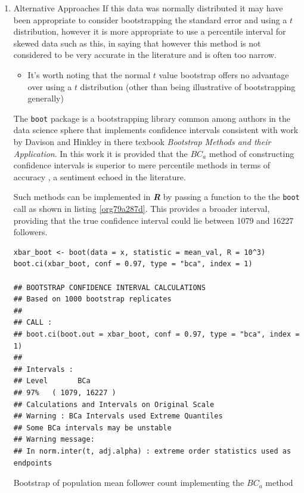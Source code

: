 \documentclass[11pt]{article}
\begin{document}
\begin{enumerate}
\item Alternative Approaches
\label{sec:org8f592e7}
If this data was normally distributed it may have been appropriate to consider
bootstrapping the standard error and using a \(t\) distribution, however it is more appropriate to use a
percentile interval for skewed data such as this, in saying that however this method is not considered to be very accurate in the literature and is often too narrow. \cite[Section 4.1]{hesterberg2015}

\begin{itemize}
\item It's worth noting that the normal \(t\) value bootstrap offers no advantage over
using a \(t\) distribution (other than being illustrative of bootstrapping
generally) \cite[Section 4.1]{hesterberg2015}
\end{itemize}


 The \texttt{boot} package is a bootstrapping library common among authors in the data science sphere
 \cite[p. 295]{james2013} \cite[p. 237]{wiley2019} that implements
 confidence intervals consistent with work by Davison and Hinkley
 \cite{ripley2020} in there texbook \emph{Bootstrap Methods and their Application}.
In this work it is provided that the \(BC_{a}\) method of constructing confidence
 intervals is  superior to mere percentile
 methods in terms of accuracy \cite[Ch. 5]{davison1997}, a sentiment echoed in the literature. \cite[Ch. 5]{carpenter2000,davison1997}

Such methods can be implemented in \textbf{\emph{R}} by passing a function to the the \texttt{boot} call as shown in listing \ref{org79a287d}. This provides a broader interval, providing that the true confidence interval could lie between 1079 and 16227 followers.

\begin{listing}[htbp]
\begin{verbatim}
xbar_boot <- boot(data = x, statistic = mean_val, R = 10^3)
boot.ci(xbar_boot, conf = 0.97, type = "bca", index = 1)

## BOOTSTRAP CONFIDENCE INTERVAL CALCULATIONS
## Based on 1000 bootstrap replicates
##
## CALL :
## boot.ci(boot.out = xbar_boot, conf = 0.97, type = "bca", index = 1)
##
## Intervals :
## Level       BCa
## 97%   ( 1079, 16227 )
## Calculations and Intervals on Original Scale
## Warning : BCa Intervals used Extreme Quantiles
## Some BCa intervals may be unstable
## Warning message:
## In norm.inter(t, adj.alpha) : extreme order statistics used as endpoints
\end{verbatim}
\caption{\label{org79a287d}Bootstrap of population mean follower count implementing the \(BC_{a}\) method}
\end{listing}

\label{orgba91979}


\label{org3bcf1a0}
 
\end{enumerate}
\end{document}
